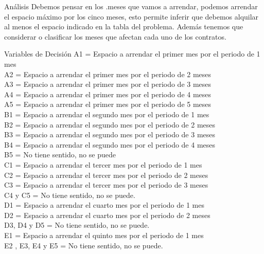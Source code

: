 \documentclass{beamer}
\begin{document}
\begin{frame}[fragile]{Análisis}
Debemos pensar en los .meses que vamos a arrendar, podemos arrendar el espacio máximo por los cinco meses, esto permite inferir que debemos alquilar al menos el espacio indicado en la tabla del problema. Además tenemos que considerar o clasificar los meses que afectan cada uno de los contratos.

\end{frame}
\begin{frame}[fragile]{Variables de Decisión}
A1 = Espacio a arrendar el primer mes por el periodo de 1 mes\\
A2 = Espacio a arrendar el primer mes por el periodo de 2 meses\\
A3 = Espacio a arrendar el primer mes por el periodo de 3 meses\\
A4 = Espacio a arrendar el primer mes por el periodo de 4 meses\\
A5 = Espacio a arrendar el primer mes por el periodo de 5 meses\\
B1 = Espacio a arrendar el segundo mes por el periodo de 1 mes\\
B2 = Espacio a arrendar el segundo mes por el periodo de 2 meses\\
B3 = Espacio a arrendar el segundo mes por el periodo de 3 meses\\
B4 = Espacio a arrendar el segundo mes por el periodo de 4 meses\\
B5 = No tiene sentido, no se puede\\
C1 = Espacio a arrendar el tercer mes por el periodo de 1 mes\\
C2 = Espacio a arrendar el tercer mes por el periodo de 2 meses\\
C3 = Espacio a arrendar el tercer mes por el periodo de 3 meses\\
C4 y C5 =  No tiene sentido, no se puede.\\
D1 = Espacio a arrendar el cuarto mes por el periodo de 1 mes\\
D2 = Espacio a arrendar el cuarto mes por el periodo de 2 meses\\
D3, D4 y D5 =  No tiene sentido, no se puede.\\
E1 = Espacio a arrendar el quinto mes por el periodo de 1 mes\\
E2 , E3, E4 y E5 =  No tiene sentido, no se puede.\\

\end{frame}
\end{document}
